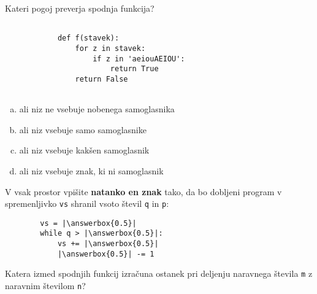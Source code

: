 \documentclass[arhiv, 10pt]{../izpit}
\newcommand{\inlinepy}[1]{\texttt{#1}}
\newcommand{\answerbox}[1]{\framebox{\vphantom{\large M}\hspace{#1cm}}}
\begin{document}
        \naloga*

        \begin{multicols}{2}
        \noindent
        Kateri pogoj preverja spodnja funkcija?
        \begin{verbatim}
        
            def f(stavek):
                for z in stavek:
                    if z in 'aeiouAEIOU':
                        return True
                return False
            
        \end{verbatim}

        \begin{enumerate}[(a)]
\item ali niz ne vsebuje nobenega samoglasnika
\item ali niz vsebuje samo samoglasnike
\item ali niz vsebuje kakšen samoglasnik
\item ali niz vsebuje znak, ki ni samoglasnik
\end{enumerate}

        \end{multicols}
    
        \naloga*
        \begin{multicols}{2}
        \noindent
        V vsak prostor vpišite \textbf{natanko en znak} tako, da bo dobljeni program v spremenljivko \inlinepy{vs} shranil vsoto števil \inlinepy{q} in \inlinepy{p}:
        
        \columnbreak
        \begin{verbatim}
        vs = |\answerbox{0.5}|
        while q > |\answerbox{0.5}|:
            vs += |\answerbox{0.5}|
            |\answerbox{0.5}| -= 1
        \end{verbatim}
        \end{multicols}
    
        \clearpage
        \naloga
        
        Katera izmed spodnjih funkcij izračuna ostanek pri deljenju naravnega števila \inlinepy{m} z naravnim številom \inlinepy{n}?
    
\end{document}
